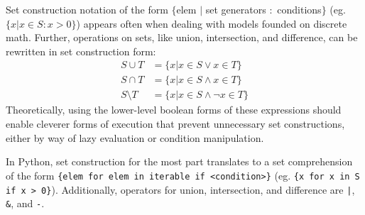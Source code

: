 \documentclass{article}
\begin{document}
Set construction notation of the form $\{$elem $|$ set generators $:$ conditions$\}$ (eg. $\{x | x \in S : x > 0\}$) appears often when dealing with models founded on discrete math. Further, operations on sets, like union, intersection, and difference, can be rewritten in set construction form:
\begin{align*}
  S \cup T &= \{x | x \in S \lor x \in T\}\\
  S \cap T &= \{x | x \in S \land x \in T\}\\
  S \setminus T &= \{x | x \in S \land \lnot x \in T\}
\end{align*}
Theoretically, using the lower-level boolean forms of these expressions should enable cleverer forms of execution that prevent unnecessary set constructions, either by way of lazy evaluation or condition manipulation.

In Python, set construction for the most part translates to a set comprehension of the form \texttt{\{elem for elem in iterable if <condition>\}} (eg. \texttt{\{x for x in S if x > 0\}}). Additionally, operators for union, intersection, and difference are \texttt{|}, \texttt{\&}, and \texttt{-}.
\end{document}
